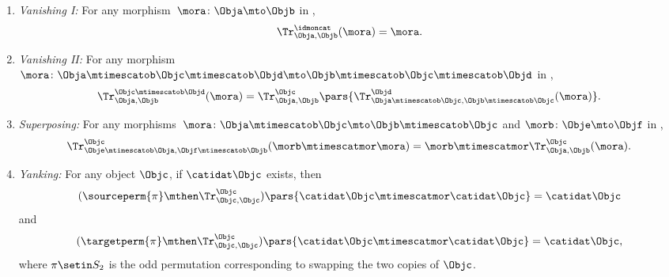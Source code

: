 {\begin{widepar}
\begin{ctdefinition}
\begin{enumerate}
            \item \emph{Vanishing I:}
                  For any morphism~$\mora \colon \Obja\mto \Objb$ in \CatC,
                  \begin{equation}
                      \label{eq:semicat-trace-vanishing_1-b}
                      \Tr_{\Obja,\Objb}^\idmoncat (\mora)=\mora.
                  \end{equation}

            \item \emph{Vanishing II:}
                  For any morphism~$\mora \colon \Obja\mtimescatob \Objc \mtimescatob \Objd \mto \Objb\mtimescatob \Objc \mtimescatob \Objd$ in \CatC,
                  \begin{equation}
                      \label{eq:semicat-trace-vanishing_2-b}
                      \Tr_{\Obja,\Objb}^{\Objc\mtimescatob \Objd}(\mora)=\Tr_{\Obja,\Objb}^\Objc\pars{
                          \Tr_{\Obja \mtimescatob \Objc, \Objb \mtimescatob \Objc}^\Objd(\mora)}.
                  \end{equation}

            \item \emph{Superposing:}
                  For any morphisms~$\mora\colon \Obja\mtimescatob \Objc \mto \Objb\mtimescatob \Objc$ and $\morb \colon \Obje \mto \Objf$ in \CatC,
                  \begin{equation}
                      \label{eq:semicat-trace-superposing-b}
                      \Tr_{\Obje\mtimescatob \Obja,\Objf\mtimescatob \Objb}^{\Objc}(\morb \mtimescatmor \mora)=\morb \mtimescatmor \Tr_{\Obja,\Objb}^\Objc(\mora).
                  \end{equation}

            \item \emph{Yanking:}
                  For any object $\Objc$, if $\catidat\Objc$ exists, then
                  \begin{equation}
                      \label{eq:semicat-trace-yanking-I-b}
                      (\sourceperm{\pi} \mthen \Tr_{\Objc,\Objc}^\Objc)\pars{\catidat\Objc \mtimescatmor \catidat\Objc }=\catidat\Objc
                  \end{equation}
                  and
                  \begin{equation}
                      \label{eq:semicat-trace-yanking-II-b}
                      (\targetperm{\pi} \mthen \Tr_{\Objc,\Objc}^\Objc)\pars{\catidat\Objc \mtimescatmor \catidat\Objc }=\catidat\Objc,
                  \end{equation}
                  where $\pi \setin S_2$ is the odd permutation corresponding to swapping the two copies of $\Objc$.
        \end{enumerate}
    \end{ctdefinition}
\end{widepar}

}
